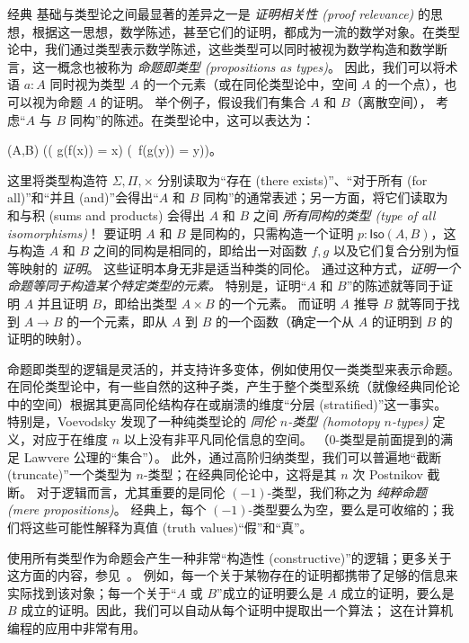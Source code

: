 经典
基础与类型论之间最显著的差异之一是 \emph{证明相关性 (proof relevance)} 的思想，根据这一思想，数学陈述，甚至它们的证明，都成为一流的数学对象。在类型论中，我们通过类型表示数学陈述，这些类型可以同时被视为数学构造和数学断言，这一概念也被称为 \emph{命题即类型 (propositions as types)}。
因此，我们可以将术语 $a : A$ 同时视为类型 $A$ 的一个元素（或在同伦类型论中，空间 $A$ 的一个点），也可以视为命题 $A$ 的证明。
举个例子，假设我们有集合 $A$ 和 $B$（离散空间），
考虑“$A$ 与 $B$ 同构”的陈述。在类型论中，这可以表达为：
\begin{narrowmultline*}
    (A,B)  \narrowbreak
    \Big(\big( g(f(x)) = x\big) \times \big(\, f(g(y)) = y\big)\Big)。
\end{narrowmultline*}
%
这里将类型构造符 $\Sigma, \Pi, \times$ 分别读取为“存在 (there exists)”、“对于所有 (for all)”和“并且 (and)”会得出“$A$ 和 $B$ 同构”的通常表述；另一方面，将它们读取为和与积 (sums and products) 会得出 $A$ 和 $B$ 之间 \emph{所有同构的类型 (type of all isomorphisms)}！
要证明 $A$ 和 $B$ 是同构的，只需构造一个证明 $p : \mathsf{Iso}(A,B)$，这与构造 $A$ 和 $B$ 之间的同构是相同的，即给出一对函数 $f, g$ 以及它们复合分别为恒等映射的 \emph{证明}。
这些证明本身无非是适当种类的同伦。
通过这种方式，\emph{证明一个命题等同于构造某个特定类型的元素。}
特别是，证明“$A$ 和 $B$”的陈述就等同于证明 $A$ 并且证明 $B$，即给出类型 $A\times B$ 的一个元素。
而证明 $A$ 推导 $B$ 就等同于找到 $A\to B$ 的一个元素，即从 $A$ 到 $B$ 的一个函数（确定一个从 $A$ 的证明到 $B$ 的证明的映射）。

命题即类型的逻辑是灵活的，并支持许多变体，例如使用仅一类类型来表示命题。在同伦类型论中，有一些自然的这种子类，产生于整个类型系统（就像经典同伦论中的空间）根据其更高同伦结构存在或崩溃的维度“分层 (stratified)”这一事实。
特别是，Voevodsky 发现了一种纯类型论的 \emph{同伦 $n$-类型 (homotopy $n$-types)} 定义，对应于在维度 $n$ 以上没有非平凡同伦信息的空间。
（$0$-类型是前面提到的满足 Lawvere 公理的“集合”）。
此外，通过高阶归纳类型，我们可以普遍地“截断 (truncate)”一个类型为 $n$-类型；在经典同伦论中，这将是其 $n$ 次 Postnikov 截断。
对于逻辑而言，尤其重要的是同伦 $(-1)$-类型，我们称之为 \emph{纯粹命题 (mere propositions)}。
经典上，每个 $(-1)$-类型要么为空，要么是可收缩的；我们将这些可能性解释为真值 (truth values)“假”和“真”。

使用所有类型作为命题会产生一种非常“构造性 (constructive)”的逻辑；更多关于这方面的内容，参见~\cite{kolmogorov,TroelstraI,TroelstraII}。
例如，每一个关于某物存在的证明都携带了足够的信息来实际找到该对象；每一个关于“$A$ 或 $B$”成立的证明要么是 $A$ 成立的证明，要么是 $B$ 成立的证明。因此，我们可以自动从每个证明中提取出一个算法；
这在计算机编程的应用中非常有用。

